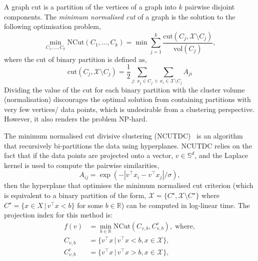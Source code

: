 \documentclass{book}
\def\R{\mathbb{R}}
\begin{document}
A graph cut is a partition of the vertices of a graph into $k$ pairwise
disjoint components. The \emph{minimum normalised cut} of a graph is the
solution to the following optimisation problem,
%
\begin{equation}\label{eq:ncut}
%
\min_{C_1,\ldots, C_k} \textrm{NCut}(C_1,\ldots,C_k) = \min \sum_{j=1}^k \frac{\mathrm{cut}\left(C_j, \mathcal{X} \setminus
C_j \right)}{\textrm{vol}(C_j)}, 
%
\end{equation}
%
where the cut of binary partition is defined as,
%
\begin{equation*}
\textrm{cut}\left(C_j, \mathcal{X} \setminus C_j \right) = \frac{1}{2} 
\sum_{j:\, x_j \in C_j} \sum_{i:\, x_i \in \mathcal{X} \setminus C_j} A_{ji}
%
\end{equation*}
%
Dividing the value of the cut for each binary partition
with the cluster volume
(normalisation) discourages the optimal
solution from containing partitions with very few vertices/ data points, which
is undesirable from a clustering perspective.
%
However, it also renders the problem NP-hard.


The minimum normalised cut divisive clustering
(NCUTDC)~\cite{Hofmeyr2017} is an algorithm that recursively bi-partitions
the data using hyperplanes. 
%
%
NCUTDC relies on the fact that if the data points are projected onto a vector, $v \in \mathbb{S}^d$,
and the Laplace kernel is used to compute the pairwise similarities, 
%
\[A_{ij} = \exp\left( -\left|v^\top x_i - v^\top x_j\right|/\sigma \right), \]
%
then the hyperplane that optimises the minimum normalised cut criterion
(which is equivalent to a binary partition of the form,
$\mathcal{X} = \{C^\star, \mathcal{X}\setminus C^\star\}$ where
$C^\star = \{x \in X \,|\, v^\top x < b\}$ for some $b \in \R$)
%
can be computed in log-linear time.
%
%
%
The projection index for this method is:
%
\begin{align*}
%
f(v) & = \min_{b \in \R} \mathrm{NCut}\left( C_{v,b},  C_{v,b}^c \right), \;
\textrm{where},\\
%
C_{v,b} & = \{ v^\top x \,|\, v^\top x < b, x \in \mathcal{X}\}, \\
%
C^c_{v,b} & = \{ v^\top x \,|\, v^\top x > b, x \in \mathcal{X}\}, \\
%
\end{align*}
\end{document}

